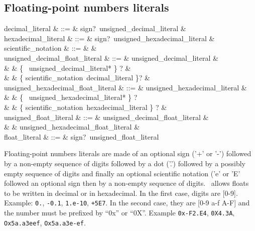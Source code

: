 \subsection{Floating-point numbers literals}
\begin{syntax}
decimal_literal & ::= & sign?\ unsigned\_decimal\_literal & \\
hexadecimal\_literal & ::= & sign?\ unsigned\_hexadecimal\_literal & \\
scientific\_notation & ::= &  \mid {} & \\
unsigned\_decimal\_float\_literal & ::= & unsigned\_decimal\_literal & \\
& &  \{ \ unsigned\_decimal\_literal* \} ? & \\
& &  \{ scientific\_notation\ decimal\_literal \}? & \\
unsigned\_hexadecimal\_float\_literal & ::= & unsigned\_hexadecimal\_literal &\\
& & \{ \ unsigned\_hexadecimal\_literal* \} ? \\
& & \{ scientific\_notation\ hexadecimal\_literal \} ? & \\
unsigned\_float\_literal & ::= & unsigned\_decimal\_float\_literal & \\
& & \mid unsigned\_hexadecimal\_float\_literal & \\
float\_literal & ::= & sign?\ unsigned\_float\_literal
\end{syntax}

Floating-point numbers literals are made of an optional sign ('+' or
'-') followed by a non-empty sequence of digits followed by a dot
('.') followed by a possibly empty sequence of digits and finally an
optional scientific notation ('e' or 'E' followed an optional sign
then by a non-empty sequence of digits. \focal\ allows floats to be
written in decimal or in hexadecimal. In the first case, digits are
[0-9]. Example: {\tt 0.}, {\tt -0.1}, {\tt 1.e-10}, {\tt +5E7}.
In the second case, they are [0-9 a-f A-F] and the number must be
prefixed by ``0x'' or ``0X''. Example {\tt 0x-F2.E4}, {\tt 0X4.3A},
{\tt Ox5a.a3eef}, {\tt Ox5a.a3e-ef}.




